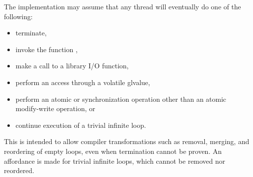 \pnum
The implementation may assume that any thread
%
%
%
%
%
will eventually do one of the following:
\begin{itemize}
\item terminate,
\item invoke the function ,
\item make a call to a library I/O function,
\item perform an access through a volatile glvalue,
\item perform an atomic or synchronization operation
other than an atomic modify-write operation, or
\item continue execution of a trivial infinite loop.
\end{itemize}
\begin{note}
This is intended to allow compiler transformations
such as removal, merging, and reordering of empty loops,
even when termination cannot be proven.
An affordance is made for trivial infinite loops,
which cannot be removed nor reordered.
\end{note}

